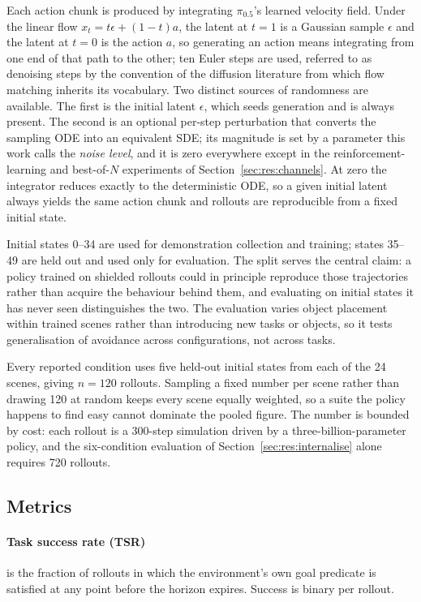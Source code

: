 \documentclass[a4paper,11pt]{report}
\begin{document}
Each action chunk is produced by integrating $\pi_{0.5}$'s learned velocity field. Under the linear
flow $x_t = t\epsilon + (1-t)a$, the latent at $t = 1$ is a Gaussian sample $\epsilon$ and the
latent at $t = 0$ is the action $a$, so generating an action means integrating from one end of that
path to the other; ten Euler steps are used, referred to as denoising steps by the convention of
the diffusion literature from which flow matching inherits its vocabulary. Two distinct sources of
randomness are available. The first is the initial latent $\epsilon$, which seeds generation and is
always present. The second is an optional per-step perturbation that converts the sampling ODE into
an equivalent SDE; its magnitude is set by a parameter this work calls the \emph{noise level}, and
it is zero everywhere except in the reinforcement-learning and best-of-$N$ experiments of
Section~\ref{sec:res:channels}. At zero the integrator reduces exactly to the deterministic ODE, so
a given initial latent always yields the same action chunk and rollouts are reproducible from a
fixed initial state.



Initial states 0--34 are used for demonstration collection and training; states 35--49 are held out
and used only for evaluation. The split serves the central claim: a policy trained on shielded
rollouts could in principle reproduce those trajectories rather than acquire the behaviour behind
them, and evaluating on initial states it has never seen distinguishes the two. The evaluation
varies object placement within trained scenes rather than introducing new tasks or objects, so it
tests generalisation of avoidance across configurations, not across tasks.

Every reported condition uses five held-out initial states from each of the 24 scenes, giving
$n = 120$ rollouts. Sampling a fixed number per scene rather than drawing 120 at random keeps every
scene equally weighted, so a suite the policy happens to find easy cannot dominate the pooled
figure. The number is bounded by cost: each rollout is a 300-step simulation driven by a
three-billion-parameter policy, and the six-condition evaluation of
Section~\ref{sec:res:internalise} alone requires 720 rollouts.


\subsection{Metrics}\label{sec:metrics}

\paragraph{Task success rate (TSR)} is the fraction of rollouts in which the environment's own goal
predicate is satisfied at any point before the
horizon expires. Success is binary per rollout.
\end{document}
